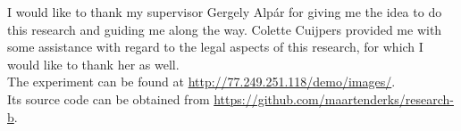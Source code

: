 I would like to thank my supervisor Gergely Alp\'{a}r for giving me the idea to do this research and guiding me along the way. Colette Cuijpers provided me with some assistance with regard to the legal aspects of this research, for which I would like to thank her as well.\\

The experiment can be found at \url{http://77.249.251.118/demo/images/}.\\ Its source code can be obtained from \url{https://github.com/maartenderks/research-b}.